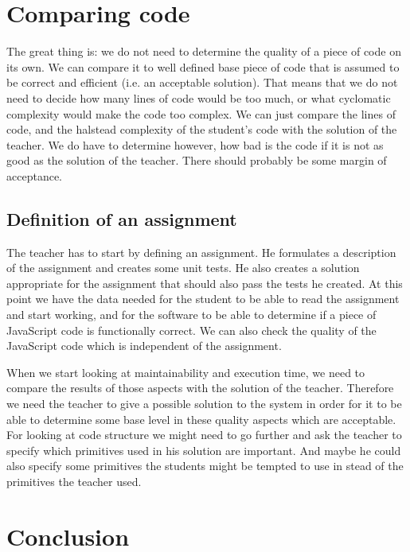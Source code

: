 \documentclass{article}
\begin{document}
\section{Comparing code}

The great thing is: we do not need to determine the quality of a piece of code
on its own. We can compare it to well defined base piece of code that is
assumed to be correct and efficient (i.e. an acceptable solution). That means
that we do not need to decide how many lines of code would be too much, or what
cyclomatic complexity would make the code too complex. We can just compare the
lines of code, and the halstead complexity of the student's code with the
solution of the teacher. We do have to determine however, how bad is the code
if it is not as good as the solution of the teacher. There should probably be
some margin of acceptance.

\subsection{Definition of an assignment}

The teacher has to start by defining an assignment. He formulates a description
of the assignment and creates some unit tests. He also creates a solution
appropriate for the assignment that should also pass the tests he created. At
this point we have the data needed for the student to be able to read the
assignment and start working, and for the software to be able to determine if a
piece of JavaScript code is functionally correct. We can also check the quality
of the JavaScript code which is independent of the assignment.

When we start looking at maintainability and execution time, we need to compare
the results of those aspects with the solution of the teacher. Therefore we
need the teacher to give a possible solution to the system in order for it to
be able to determine some base level in these quality aspects which are
acceptable. For looking at code structure we might need to go further and ask the teacher to specify which primitives used in his solution are important. And maybe he could also specify some primitives the students might be tempted to use in stead of the primitives the teacher used.

\section{Conclusion}



\end{document}
